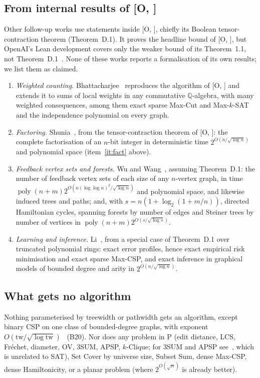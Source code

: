 \documentclass[10pt]{amsart}
\theoremstyle{plain}
\theoremstyle{definition}
\theoremstyle{remark}
\numberwithin{equation}{section}
\newcommand{\poly}{\operatorname{poly}}
\newcommand{\Oa}[1][]{\textup{[O\if\relax\detokenize{#1}\relax\else, #1\fi]}}
\begin{document}
\subsection{From internal results of \texorpdfstring{\Oa}{[O]}}\label{sec:newO}
Other follow-up works use statements inside \Oa, chiefly its Boolean tensor-contraction theorem
(Theorem~D.1). It proves the headline bound of \Oa, but OpenAI's Lean development covers only the
weaker bound of its Theorem~1.1, not Theorem~D.1~\cite[\S2.3]{Li26}. None of these works reports a
formalisation of its own results; we list them as claimed.
\begin{enumerate}[label=\textup{(\roman*)},resume]
\item \emph{Weighted counting.} Bhattacharjee~\cite{Bhattacharjee26} reproduces the algorithm of
\Oa{} and extends it to sums of local weights in any commutative $\mathbb{Q}$-algebra, with many
weighted consequences, among them exact sparse Max-Cut and Max-$k$-SAT and the independence
polynomial on every graph.
\item \emph{Factoring.} Shunia~\cite{Shu26}, from the tensor-contraction theorem of \Oa: the
complete factorisation of an $n$-bit integer in deterministic time $2^{O(n/\sqrt{\log n})}$ and
polynomial space (item~\ref{it:fact} above).
\item \emph{Feedback vertex sets and forests.} Wu and Wang~\cite{WW26f}, assuming Theorem~D.1: the
number of feedback vertex sets of each size of any $n$-vertex graph, in time
$\poly(n+m)2^{O(n(\log\log n)^2/\sqrt{\log n})}$ and polynomial space, and likewise induced trees
and paths; and, with $s=n(1+\log_2(1+m/n))$, directed Hamiltonian cycles, spanning forests by number
of edges and Steiner trees by number of vertices in $\poly(n+m)2^{O(s/\sqrt{\log s})}$.
\item \emph{Learning and inference.} Li~\cite{Li26}, from a special case of Theorem~D.1 over truncated
polynomial rings: exact error profiles, hence exact empirical risk minimisation and exact sparse
Max-CSP, and exact inference in graphical models of bounded degree and arity in
$2^{O(n/\sqrt{\log n})}$.
\end{enumerate}

\subsection{What gets no algorithm}
Nothing parameterised by treewidth or pathwidth gets an algorithm, except binary CSP on one class of
bounded-degree graphs, with exponent $O(\mathrm{tw}/\sqrt{\log\mathrm{tw}})$~\cite{Nguyen26} (B20).
Nor does any problem in P (edit distance, LCS, Fr\'echet, diameter, OV, 3SUM, APSP, $k$-Clique; for
3SUM and APSP see~\cite{AVW26}, which is unrelated to SAT), Set Cover by universe size, Subset Sum, dense Max-CSP, dense Hamiltonicity, or a planar problem (where
$2^{O(\sqrt n)}$ is already better).
\end{document}
